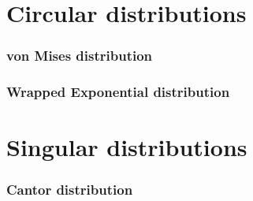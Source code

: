 \documentclass[a4paper,11pt]{article}
\theoremstyle{plain}
\theoremstyle{definition}
\begin{document}
	\pagebreak
	\part{Circular distributions}
	\section{von Mises distribution}
	\section{Wrapped Exponential distribution}
	
	\pagebreak
	\part{Singular distributions}
	\section{Cantor distribution}
	
\end{document}
